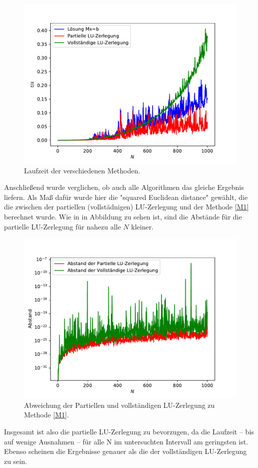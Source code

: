 \documentclass{scrartcl}
\begin{document}
        \begin{figure}[H]
            \centering
            \includegraphics[scale=0.7]{A3/build/timers.pdf}
            \caption{Laufzeit der verschiedenen Methoden.}
            \label{fig:A3times}
        \end{figure}

        Anschließend wurde verglichen, ob auch alle Algorithmen das gleiche Ergebnis liefern. Als Maß dafür wurde hier die "squared Euclidean distance" gewählt, die die zwischen der partiellen (vollstädnigen) LU-Zerlegung und der Methode \ref{M1} berechnet wurde. Wie in in Abbildung \label{fig:A3devs} zu sehen ist, sind die Abstände für die partielle LU-Zerlegung für nahezu alle $N$ kleiner.

        \begin{figure}[H]
            \centering
            \includegraphics[scale=0.7]{A3/build/devs.pdf}
            \caption{Abweichung der Partiellen und vollständigen LU-Zerlegung zu Methode \ref{M1}.}
            \label{fig:A3devs}
        \end{figure}

        Insgesamt ist also die partielle LU-Zerlegung zu bevorzugen, da die Laufzeit  – bis auf wenige Ausnahmen  – für alle N im untersuchten Intervall am geringsten ist. Ebenso scheinen die Ergebnisse genauer als die der vollständigen LU-Zerlegung zu sein.
\end{document}
